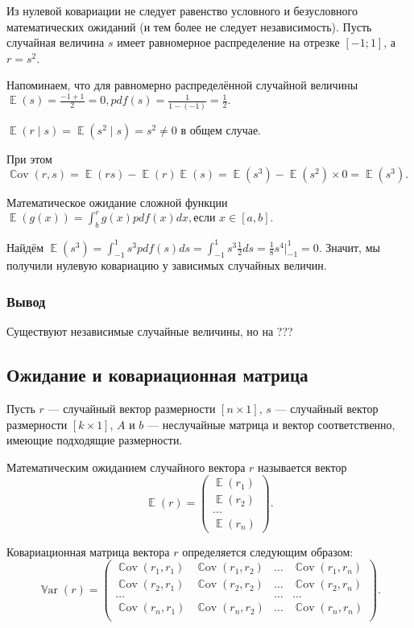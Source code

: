 \documentclass[12pt]{article}
\DeclareMathOperator{\Cov}{\mathbb{C}ov}
\DeclareMathOperator{\Var}{\mathbb{V}ar}
\DeclareMathOperator{\E}{\mathbb{E}}
\begin{document}
\begin{problem}
    Из нулевой ковариации не следует равенство условного и безусловного математических ожиданий (и тем более не следует независимость). Пусть случайная величина $s$ имеет равномерное распределение на отрезке $[-1; 1]$, а $r = s^2$.

    \begin{sol}

    Напоминаем, что для равномерно распределённой случайной величины \(\E(s) = \frac{-1+1}{2} = 0, pdf(s) = \frac{1}{1 - (-1)} = \frac{1}{2}.\)
    
    \(\E(r \mid s) = \E(s^2 \mid s) = s^2 \neq 0\) в общем случае.

    При этом \(\Cov(r, s) = \E(rs) - \E(r)\E(s) = \E(s^3) - \E(s^2) \times 0 = \E(s^3).\)

    Математическое ожидание сложной функции \( \E(g(x)) = \int^r_b g(x) pdf(x) dx, \text{если } x \in [a, b].\)
    
    Найдём \(\E(s^3) = \int^{1}_{-1} s^3 pdf(s) ds = \int^{1}_{-1} s^3 \frac{1}{2} ds = \frac{1}{8} s^4 | ^1_{-1} = 0.\) Значит, мы получили нулевую ковариацию у зависимых случайных величин.    
    \end{sol}
\end{problem}

\subsubsection*{Вывод}
Существуют независимые случайные величины, но на ???

\subsection{Ожидание и ковариационная матрица }

Пусть $r$ — случайный вектор размерности $[n \times 1]$, $s$ — случайный вектор размерности $[k \times 1]$, $A$ и $b$ — неслучайные матрица и вектор соответственно, имеющие подходящие размерности.

Математическим ожиданием случайного вектора $r$ называется вектор
\[
\E(r) = \begin{pmatrix}
	\E(r_1)  \\
	\E(r_2)  \\
        \dots \\
        \E(r_n)
      \end{pmatrix}.
\]

Ковариационная матрица вектора $r$ определяется следующим образом:
\[
\Var(r) = \begin{pmatrix}
	\Cov(r_1,r_1) & \Cov(r_1,r_2) & \dots & \Cov(r_1,r_n) \\
	\Cov(r_2,r_1) & \Cov(r_2,r_2) & \dots & \Cov(r_2,r_n) \\
        \dots & & \dots & \dots\\
        \Cov(r_n,r_1) & \Cov(r_n,r_2) & \dots & \Cov(r_n,r_n) \\
      \end{pmatrix}.
\]
\end{document}
